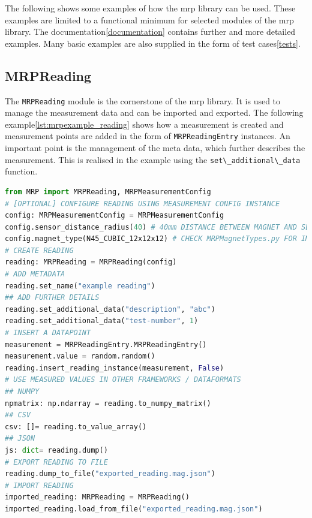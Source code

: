 The following shows some examples of how the \gls{mrp} library can be
used. These examples are limited to a functional minimum for selected
modules of the \gls{mrp} library. The documentation\ref{documentation}
contains further and more detailed examples. Many basic examples are
also supplied in the form of test cases\ref{tests}.

\hypertarget{mrpreading}{%
\subsection{MRPReading}\label{mrpreading}}

The \passthrough{\lstinline!MRPReading!} module is the cornerstone of
the \gls{mrp} library. It is used to manage the measurement data and can
be imported and exported. The following
example\ref{lst:mrpexample_reading} shows how a measurement is created
and measurement points are added in the form of
\passthrough{\lstinline!MRPReadingEntry!} instances. An important point
is the management of the meta data, which further describes the
measurement. This is realised in the example using the
\passthrough{\lstinline!set\_additional\_data!} function.

\begin{lstlisting}[language=Python, caption={MRPReading example for setting up an basic measurement}, label=lst:mrpexample_reading]
from MRP import MRPReading, MRPMeasurementConfig
# [OPTIONAL] CONFIGURE READING USING MEASUREMENT CONFIG INSTANCE
config: MRPMeasurementConfig = MRPMeasurementConfig
config.sensor_distance_radius(40) # 40mm DISTANCE BETWEEN MAGNET AND SENSOR
config.magnet_type(N45_CUBIC_12x12x12) # CHECK MRPMagnetTypes.py FOR IMPLEMENTED TYPES
# CREATE READING
reading: MRPReading = MRPReading(config)
# ADD METADATA
reading.set_name("example reading")
## ADD FURTHER DETAILS
reading.set_additional_data("description", "abc")
reading.set_additional_data("test-number", 1)
# INSERT A DATAPOINT
measurement = MRPReadingEntry.MRPReadingEntry()
measurement.value = random.random()
reading.insert_reading_instance(measurement, False)
# USE MEASURED VALUES IN OTHER FRAMEWORKS / DATAFORMATS
## NUMPY
npmatrix: np.ndarray = reading.to_numpy_matrix()
## CSV
csv: []= reading.to_value_array()
## JSON
js: dict= reading.dump()
# EXPORT READING TO FILE
reading.dump_to_file("exported_reading.mag.json")
# IMPORT READING
imported_reading: MRPReading = MRPReading()
imported_reading.load_from_file("exported_reading.mag.json")
\end{lstlisting}


